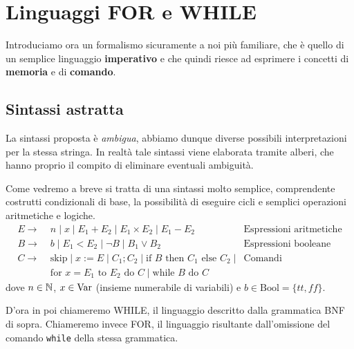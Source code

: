\section{Linguaggi FOR e WHILE}
Introduciamo ora un formalismo sicuramente a noi più familiare,
che è quello di un semplice linguaggio \textbf{imperativo} e
che quindi riesce ad esprimere i concetti di \textbf{memoria}
e di \textbf{comando}.

\subsection{Sintassi astratta}
La sintassi proposta è \emph{ambigua}, abbiamo dunque diverse
possibili interpretazioni per la stessa stringa. In realtà
tale sintassi viene elaborata tramite alberi, che hanno proprio
il compito di eliminare eventuali ambiguità.

Come vedremo a breve si tratta di una sintassi molto semplice,
comprendente costrutti condizionali di base, la possibilità
di eseguire cicli e semplici operazioni aritmetiche e logiche.
\begin{align*}
	E \to                                                 &
	\; n \; | \; x \; | \; E_1 + E_2 \; | \;
	E_1 \times E_2 \; | \; E_1 - E_2
	                                                      &
	\text{Espressioni aritmetiche}                          \\
	B \to                                                 &
	\; b \; | \; E_1 < E_2 \; | \; \lnot B \; | \;
	B_1 \lor B_2
	                                                      &
	\text{Espressioni booleane}                             \\
	C\to                                                  &
	\; \text{skip} \; | \; x := E \; | \; C_1 ; C_2 \; | \;
	\text{if } B \text{ then } C_1 \text{ else } C_2 \; | &
	\text{Comandi}                                          \\ &
	\; \text{for } x = E_1 \text{ to } E_2 \text{ do } C \; |
	\; \text{while } B \text{ do } C
\end{align*}
dove $n \in \mathbb{N}$, $x \in \operatorname{Var}$ (insieme numerabile di
variabili) e $b \in \text{Bool} = \{ tt, ff \}$.

D'ora in poi chiameremo WHILE, il linguaggio descritto dalla
grammatica BNF di sopra. Chiameremo invece FOR, il linguaggio
risultante dall'omissione del comando \verb|while| della
stessa grammatica.

